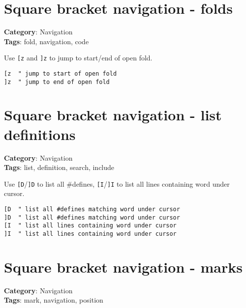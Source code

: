{{{{{{{{{\section{Square bracket navigation - folds}

\textbf{Category}: Navigation\\ \textbf{Tags}: fold, navigation, code
\vspace{0.5cm}

Use {\footnotesize \Verb§[z§} and {\footnotesize \Verb§]z§} to jump to start/end of open fold.

\begin{Exa*}{}
\begin{Verbatim}[fontsize=\footnotesize, breaklines, breakanywhere]
[z  " jump to start of open fold
]z  " jump to end of open fold
\end{Verbatim}
\end{Exa*}

\section{Square bracket navigation - list definitions}

\textbf{Category}: Navigation\\ \textbf{Tags}: list, definition, search, include
\vspace{0.5cm}

Use {\footnotesize \Verb§[D§}/{\footnotesize \Verb§]D§} to list all \#defines, {\footnotesize \Verb§[I§}/{\footnotesize \Verb§]I§} to list all lines containing word under cursor.

\begin{Exa*}{}
\begin{Verbatim}[fontsize=\footnotesize, breaklines, breakanywhere]
[D  " list all #defines matching word under cursor
]D  " list all #defines matching word under cursor  
[I  " list all lines containing word under cursor
]I  " list all lines containing word under cursor
\end{Verbatim}
\end{Exa*}

\section{Square bracket navigation - marks}

\textbf{Category}: Navigation\\ \textbf{Tags}: mark, navigation, position
\vspace{0.5cm}

}}}}}}}}}

